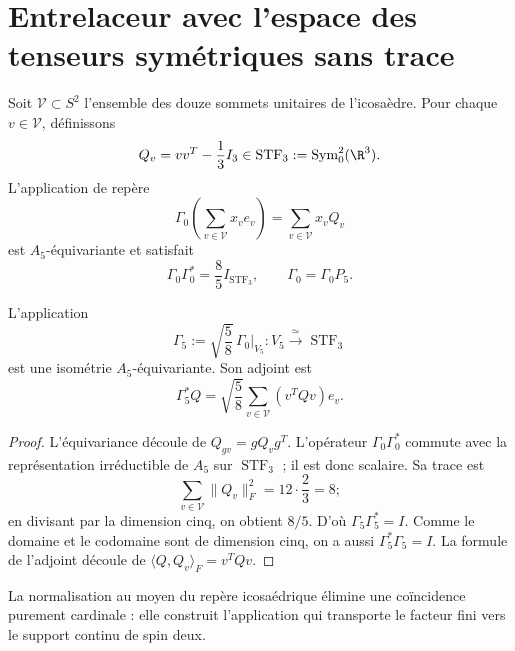 \section{Entrelaceur avec l’espace des tenseurs symétriques sans trace}

Soit \(\mathcal V\subset S^2\) l’ensemble des douze sommets unitaires de l’icosaèdre. Pour chaque \(v\in\mathcal V\), définissons
\begin{equation}
\label{rm:eq:gravity-Qv}
Q_v=vv^T-\frac13I_3\in
\operatorname{STF}_3:=\operatorname{Sym}^2_0(\R^3).
\end{equation}
L’application de repère
\begin{equation}
\label{rm:eq:gravity-Gamma0}
\Gamma_0\!\left(\sum_{v\in\mathcal V}x_ve_v\right)
=\sum_{v\in\mathcal V}x_vQ_v
\end{equation}
est \(A_5\)-équivariante et satisfait
\begin{equation}
\label{rm:eq:gravity-tight-frame}
\Gamma_0\Gamma_0^*=\frac85I_{\operatorname{STF}_3},
\qquad
\Gamma_0=\Gamma_0P_5.
\end{equation}

\begin{theorem}
\label{rm:thm:gravity-gamma5}
L’application
\begin{equation}
\label{rm:eq:gravity-gamma5}
\boxed{
\Gamma_5:=\sqrt{\frac58}\,\Gamma_0|_{V_5}:
V_5\xrightarrow{\ \simeq\ }\operatorname{STF}_3}
\end{equation}
est une isométrie \(A_5\)-équivariante. Son adjoint est
\begin{equation}
\label{rm:eq:gravity-gamma5-adjoint}
\Gamma_5^*Q=\sqrt{\frac58}
\sum_{v\in\mathcal V}(v^TQv)e_v.
\end{equation}
\end{theorem}

\begin{proof}
L’équivariance découle de \(Q_{gv}=gQ_vg^T\). L’opérateur
\(\Gamma_0\Gamma_0^*\) commute avec la représentation irréductible de
\(A_5\) sur \(\operatorname{STF}_3\) ; il est donc scalaire. Sa trace
est
\[
\sum_{v\in\mathcal V}\|Q_v\|_F^2
=12\cdot\frac23=8;
\]
en divisant par la dimension cinq, on obtient \(8/5\). D’où
\(\Gamma_5\Gamma_5^*=I\). Comme le domaine et le codomaine sont de dimension
cinq, on a aussi \(\Gamma_5^*\Gamma_5=I\). La formule de l’adjoint
découle de \(\langle Q,Q_v\rangle_F=v^TQv\).
\end{proof}

La normalisation au moyen du repère icosaédrique élimine une coïncidence purement cardinale : elle construit l’application qui transporte le facteur fini vers le support continu de spin deux.

